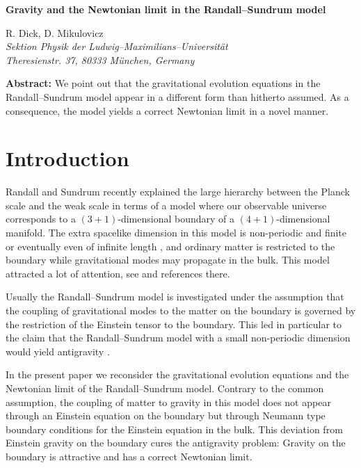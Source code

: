 \documentclass[12pt,fleqn]{article}
\begin{document}
\begin{center}
\Large\bf
Gravity and the Newtonian limit in the Randall--Sundrum model
\end{center}
\vspace{2ex}
\normalsize \rm
\begin{center}
 R. Dick, D. Mikulovicz\\[0.5ex] 
{\small\it
Sektion Physik der Ludwig--Maximilians--Universit\"at\\
Theresienstr. 37, 80333 M\"unchen, Germany}
\end{center}

\vspace{5ex}
\noindent
{\bf Abstract:} 
We point out that the gravitational
evolution equations in the Randall--Sundrum model
appear in a different form than hitherto assumed. As
a consequence, the model yields a correct Newtonian limit
 in a novel manner.

\newpage  
\section{Introduction}

Randall and Sundrum recently explained the large
hierarchy between the Planck scale and the weak
scale in terms of a model where our observable
universe corresponds to a $(3+1)$-dimensional boundary of
a $(4+1)$-dimensional manifold. The extra spacelike dimension
in this model
is non-periodic and finite \cite{RS1} or eventually even of infinite
length \cite{RS2}, and ordinary matter is restricted to the
boundary while gravitational modes may propagate in the bulk.
This model attracted a lot of attention, see \cite{more}
and references there.

Usually the Randall--Sundrum model is investigated under the
assumption that the coupling of gravitational modes to
the matter on the boundary is governed by the restriction
of the Einstein tensor to the boundary. This led in particular
to the claim
that the Randall--Sundrum model
with a small non-periodic dimension would yield antigravity
\cite{SMS}.

In the present paper we reconsider 
the gravitational evolution equations and the Newtonian limit
of the Randall--Sundrum model. Contrary to the common assumption,
the coupling of matter to gravity in this model does not appear
through an Einstein equation on the boundary but through Neumann
type boundary conditions for the Einstein equation in the bulk.
This deviation from Einstein gravity
on the boundary cures the antigravity problem:
Gravity on the boundary is attractive and has a correct Newtonian
limit.
\end{document}
